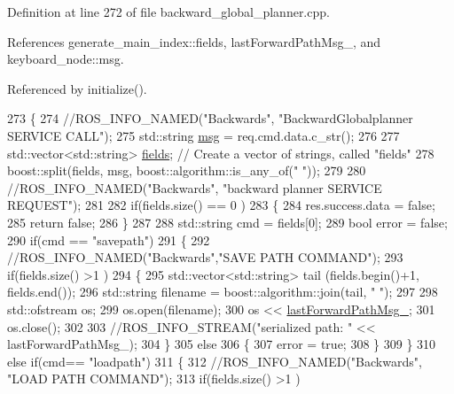 Definition at line 272 of file backward\+\_\+global\+\_\+planner.\+cpp.



References generate\+\_\+main\+\_\+index\+::fields, last\+Forward\+Path\+Msg\+\_\+, and keyboard\+\_\+node\+::msg.



Referenced by initialize().


\begin{DoxyCode}
273 \{
274     \textcolor{comment}{//ROS\_INFO\_NAMED("Backwards", "BackwardGlobalplanner SERVICE CALL");}
275     std::string \hyperlink{namespacekeyboard__node_a768777e12f75b89e4a0a60acf748e9eb}{msg} = req.cmd.data.c\_str();
276 
277     std::vector<std::string> \hyperlink{namespacegenerate__main__index_a6a2a34fa223d797862d3574a4de18caf}{fields};   \textcolor{comment}{// Create a vector of strings, called "fields"}
278     boost::split(fields, msg, boost::algorithm::is\_any\_of(\textcolor{stringliteral}{" "}));
279 
280     \textcolor{comment}{//ROS\_INFO\_NAMED("Backwards", "backward planner SERVICE REQUEST");}
281 
282     \textcolor{keywordflow}{if}(fields.size() == 0 )
283     \{
284         res.success.data = \textcolor{keyword}{false};
285         \textcolor{keywordflow}{return} \textcolor{keyword}{false};
286     \}
287 
288     std::string cmd = fields[0];
289     \textcolor{keywordtype}{bool} error = \textcolor{keyword}{false};
290     \textcolor{keywordflow}{if}(cmd == \textcolor{stringliteral}{"savepath"})
291     \{
292         \textcolor{comment}{//ROS\_INFO\_NAMED("Backwards","SAVE PATH COMMAND");}
293         \textcolor{keywordflow}{if}(fields.size() >1 )
294         \{
295             std::vector<std::string> tail (fields.begin()+1, fields.end());
296             std::string filename = boost::algorithm::join(tail, \textcolor{stringliteral}{" "});
297 
298             std::ofstream os;
299             os.open(filename);
300             os << \hyperlink{classbackward__global__planner_1_1BackwardGlobalPlanner_a2fe940d13931d4e6e27e3c3d5e5a7db8}{lastForwardPathMsg\_};
301             os.close();
302 
303             \textcolor{comment}{//ROS\_INFO\_STREAM("serialized path: " << lastForwardPathMsg\_);}
304         \}
305         \textcolor{keywordflow}{else}
306         \{
307             error = \textcolor{keyword}{true};
308         \}
309     \}
310     \textcolor{keywordflow}{else} \textcolor{keywordflow}{if}(cmd== \textcolor{stringliteral}{"loadpath"})
311     \{
312         \textcolor{comment}{//ROS\_INFO\_NAMED("Backwards", "LOAD PATH COMMAND");}
313         \textcolor{keywordflow}{if}(fields.size() >1 )

\end{DoxyCode}
